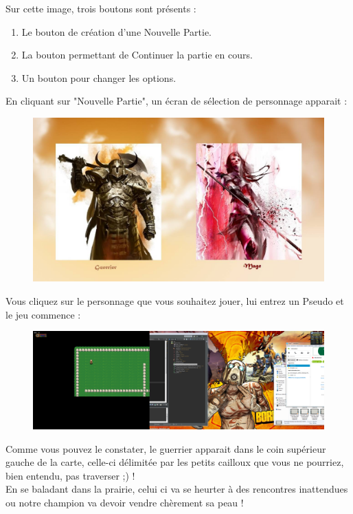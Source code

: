 \documentclass[a4paper,titlepage]{article}
\begin{document}
	Sur cette image, trois boutons sont présents : 
	\begin{enumerate}
		\item Le bouton de création d'une Nouvelle Partie.
		\item La bouton permettant de Continuer la partie en cours.
		\item Un bouton pour changer les options.
	\end{enumerate}
	
	En cliquant sur "Nouvelle Partie", un écran de sélection de personnage apparait :
	\begin{figure}[h!]
		\includegraphics[scale=0.30]{EcranCreationPersonnage.jpg}
	\end{figure}
	
	Vous cliquez sur le personnage que vous souhaitez jouer, lui entrez un Pseudo et le jeu commence :
	\begin{figure}[h!]
		\includegraphics[scale=0.65]{EcranCarte.png}
	\end{figure}
	
	Comme vous pouvez le constater, le guerrier apparait dans le coin supérieur gauche de la carte, celle-ci délimitée par les petits cailloux que vous ne pourriez, bien entendu, pas traverser ;) !\\
	
	En se baladant dans la prairie, celui ci va se heurter à des rencontres inattendues ou notre champion va devoir vendre chèrement sa peau !\\
	
\end{document}
